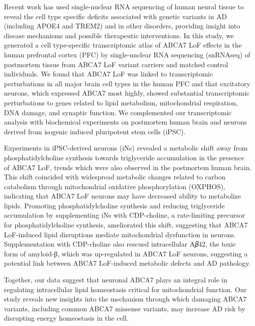 Recent work has used single-nuclear RNA sequencing of human neural tissue to reveal the cell type specific deficits associated with genetic variants in AD (including APOE4 and TREM2) and in other disorders\cite{Brase2023-xk,Blanchard2022-cf,Sayed2021-qn,Wamsley2024-zm,Kamath2022-if}, providing insight into disease mechanisms and possible therapeutic interventions. In this study, we generated a cell type-specific transcriptomic atlas of ABCA7 LoF effects in the human prefrontal cortex (PFC) by single-nuclear RNA sequencing (snRNAseq) of postmortem tissue from ABCA7 LoF variant carriers and matched control individuals. We found that ABCA7 LoF was linked to transcriptomic perturbations in all major brain cell types in the human PFC and that excitatory neurons, which expressed ABCA7 most highly, showed substantial transcriptomic perturbations  to genes related to lipid metabolism, mitochondrial respiration, DNA damage, and synaptic function. We complemented our transcriptomic analysis with biochemical experiments on postmortem human brain and neurons derived from isogenic induced pluripotent stem cells (iPSC).

Experiments in iPSC-derived neurons (iNs) revealed a metabolic shift away from phosphatidylcholine synthesis towards triglyceride accumulation in the presence of ABCA7 LoF, trends which were also observed in the postmortem human brain. This shift coincided with widespread metabolic changes related to carbon catabolism through mitochondrial oxidative phosphorylation (OXPHOS), indicating that ABCA7 LoF neurons may have decreased ability to metabolize lipids. Promoting phosphatidylcholine synthesis and reducing triglyceride accumulation by supplementing iNs with CDP-choline, a rate-limiting precursor for phosphatidylcholine synthesis, ameliorated this shift, suggesting that ABCA7 LoF-induced lipid disruptions mediate mitochondrial dysfunction in neurons. Supplementation with CDP-choline also rescued intracellular A𝛽42, the toxic form of amyloid-β\cite{Pauwels2012-ul,Fraser1991-tj,Pike1993-xs,Pettegrew2001-sm,Phillips2019-ev}, which was up-regulated in ABCA7 LoF neurons, suggesting a potential link between ABCA7 LoF-induced metabolic defects and AD pathology.

Together, our data suggest that neuronal ABCA7 plays an integral role in regulating intracellular lipid homeostasis critical for mitochondrial function. Our study reveals new insights into the mechanism through which damaging ABCA7 variants, including common ABCA7 missense variants, may increase AD risk by disrupting energy homeostasis in the cell. 

